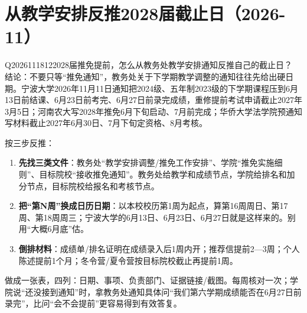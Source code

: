 \section{从教学安排反推2028届截止日（2026-11）}

\begin{qa}{Q2026111812}{2028届推免提前，怎么从教务处教学安排通知反推自己的截止日？}
结论：不要只等“推免通知”，教务处关于下学期教学调整的通知往往先给出硬日期。宁波大学2026年11月11日通知把2024级、五年制2023级的下学期课程压到6月13日前结课、6月23日前考完、6月27日前录完成绩，重修提前考试申请截止2027年3月5日；河南农大写2028年推免6月下旬启动、7月前完成；华侨大学法学院预通知写材料截止2027年6月30日、7月下旬定资格、8月考核。

按三步反推：

\begin{enumerate}
\item \textbf{先找三类文件}：教务处“教学安排调整/推免工作安排”、学院“推免实施细则”、目标院校“接收推免通知”。教务处给教学和成绩节点，学院给排名和加分节点，目标院校给报名和考核节点。
\item \textbf{把“第N周”换成日历日期}：以本校校历第1周为起点，算第16周周日、第17周、第18周周三；宁波大学的6月13日、6月23日、6月27日就是这样来的。别用“大概6月底”估。
\item \textbf{倒排材料}：成绩单/排名证明在成绩录入后1周内开；推荐信提前2—3周；个人陈述提前1个月；冬令营/夏令营按目标院校截止再提前1周。
\end{enumerate}

做成一张表，四列：日期、事项、负责部门、证据链接/截图。每周核对一次；学院说“还没接到通知”时，拿教务处通知具体问“我们第六学期成绩能否在6月27日前录完”，比问“会不会提前”更容易得到有效答复。
\end{qa}
